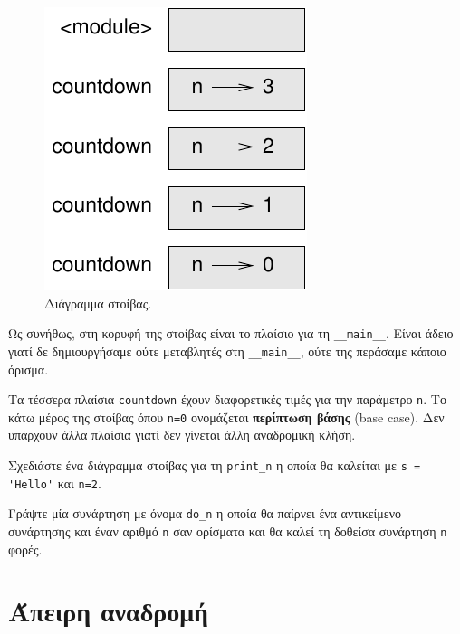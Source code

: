 \documentclass[10pt]{book}
\begin{document}
\begin{figure}
\centerline
{\includegraphics[scale=0.8]{figs/stack2.pdf}}
\caption{Διάγραμμα στοίβας.}
\label{fig.stack2}
\end{figure}


Ως συνήθως, στη κορυφή της στοίβας είναι το πλαίσιο για τη \verb"__main__". Είναι άδειο γιατί δε δημιουργήσαμε ούτε μεταβλητές στη \verb"__main__", ούτε της περάσαμε κάποιο όρισμα.

Τα τέσσερα πλαίσια {\tt countdown} έχουν διαφορετικές τιμές για την παράμετρο {\tt n}. Το κάτω μέρος της στοίβας όπου {\tt n=0} ονομάζεται {\bf περίπτωση βάσης} (base case). Δεν υπάρχουν άλλα πλαίσια γιατί δεν γίνεται άλλη αναδρομική κλήση.\\

\begin{exercise}

Σχεδιάστε ένα διάγραμμα στοίβας για τη \verb"print_n" η οποία θα καλείται με \verb"s = 'Hello'" και {\tt n=2}.

\end{exercise}

\begin{exercise}

Γράψτε μία συνάρτηση με όνομα \verb"do_n" η οποία θα παίρνει ένα αντικείμενο συνάρτησης και έναν αριθμό {\tt n} σαν ορίσματα και θα καλεί τη δοθείσα συνάρτηση {\tt n} φορές.

\end{exercise}


\section{Άπειρη αναδρομή}
\end{document}
